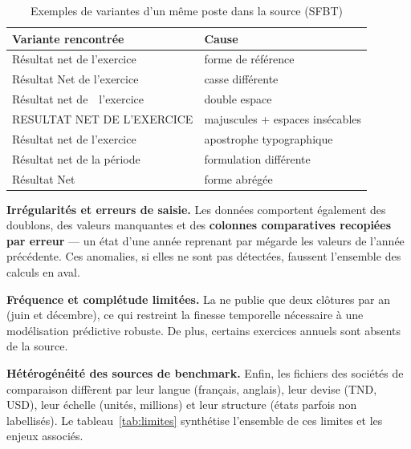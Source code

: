 \begin{table}[H]
  \centering
  \caption[Variantes de libellés]{Exemples de variantes d'un même poste dans la source (SFBT)}
  \label{tab:variantes}
  \begin{tabular}{|l|l|}
    \hline
    \textbf{Variante rencontrée} & \textbf{Cause} \\ \hline
    Résultat net de l'exercice & forme de référence \\ \hline
    Résultat Net de l'exercice & casse différente \\ \hline
    Résultat net de~~l'exercice & double espace \\ \hline
    RESULTAT NET DE L'EXERCICE & majuscules + espaces insécables \\ \hline
    Résultat net de l'exercice & apostrophe typographique \\ \hline
    Résultat net de la période & formulation différente \\ \hline
    Résultat Net & forme abrégée \\ \hline
  \end{tabular}
\end{table}

\par \textbf{Irrégularités et erreurs de saisie.} Les données comportent
également des doublons, des valeurs manquantes et des \textbf{colonnes
comparatives recopiées par erreur} — un état d'une année reprenant par mégarde
les valeurs de l'année précédente. Ces anomalies, si elles ne sont pas détectées,
faussent l'ensemble des calculs en aval.

\par \textbf{Fréquence et complétude limitées.} La \sfbt ne publie que deux
clôtures par an (juin et décembre), ce qui restreint la finesse temporelle
nécessaire à une modélisation prédictive robuste. De plus, certains exercices
annuels sont absents de la source.

\par \textbf{Hétérogénéité des sources de benchmark.} Enfin, les fichiers des
sociétés de comparaison diffèrent par leur langue (français, anglais), leur devise
(TND, USD), leur échelle (unités, millions) et leur structure (états parfois non
labellisés). Le tableau~\ref{tab:limites} synthétise l'ensemble de ces limites et
les enjeux associés.

